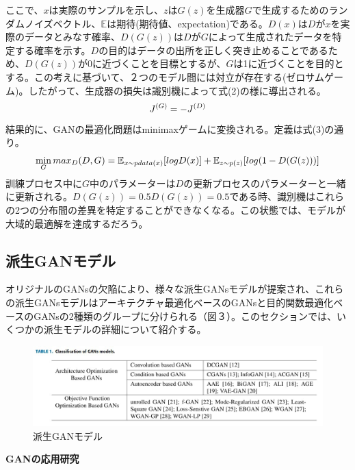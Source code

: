 \documentclass{jarticle}
\begin{document}
ここで、$x$は実際のサンプルを示し、$z$は$G(z)$を生成器$G$で生成するためのランダムノイズベクトル、$\mathbb{E}$は期待(期待値、expectation)である。$D(x)$は$D$が$x$を実際のデータとみなす確率、$D(G(z))$は$D$が$G$によって生成されたデータを特定する確率を示す。$D$の目的はデータの出所を正しく突き止めることであるため、$D(G(z))$が0に近づくことを目標とするが、$G$は1に近づくことを目的とする。この考えに基づいて、２つのモデル間には対立が存在する(ゼロサムゲーム)。したがって、生成器の損失は識別機によって式(2)の様に導出される。\\
\begin{equation}
\centering
J^{(G)}=-J^{(D)}
\end{equation}
結果的に、GANの最適化問題はminimaxゲームに変換される。定義は式(3)の通り。\\
\begin{equation}
\centering
\min_{G} max_{D} (D,G) = \mathbb{E}_{x\sim pdata(x)}[logD(x)]+\mathbb{E}_{z\sim p(z)}[log(1-D(G(z)))]
\end{equation}
訓練プロセス中に$G$中のパラメーターは$D$の更新プロセスのパラメーターと一緒に更新される。$D(G(z))=0.5D(G(z))=0.5$である時、識別機はこれらの2つの分布間の差異を特定することができなくなる。この状態では、モデルが大域的最適解を達成するだろう。

\subsection{派生GANモデル}
オリジナルのGANsの欠陥により、様々な派生GANsモデルが提案され、これらの派生GANsモデルはアーキテクチャ最適化ベースのGANsと目的関数最適化ベースのGANsの2種類のグループに分けられる（図３）。このセクションでは、いくつかの派生モデルの詳細について紹介する。\\
\begin{figure}[h]
\centering
\includegraphics[width=14cm]{pic4.jpeg}
\caption{派生GANモデル}
\label{GAN3}
\end{figure}

\textbf{GANの応用研究}
\end{document}
